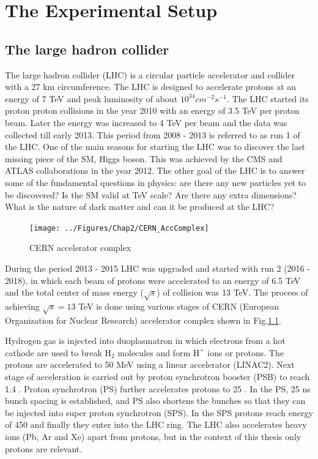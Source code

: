 \chapter{The Experimental Setup}
\label{Chap2}

\section{The large hadron collider}
The large hadron collider (LHC) is a circular particle accelerator and collider with a 27 km circumference. The LHC is designed to 
accelerate protons at an energy of 7 TeV \cite{Bruning:782076} and peak luminosity of about $10^{34}cm^{-2}s^{-1}$.
The LHC started its proton proton collisions in the year 2010 with an energy of 3.5 TeV per proton beam. Later the energy was increased
to 4 TeV per beam and the data was collected till early 2013. This period from 2008 - 2013 is referred to as run 1 of the LHC. 
One of the main reasons for starting the LHC was to discover the last missing piece of the SM, Higgs boson. This was
achieved by the CMS and ATLAS collaborations \cite{Aad:2012tfa}\cite{Chatrchyan:2012xdj} in the year 2012. The other goal of
the LHC is to answer some of the fundamental questions in physics: are there any new particles yet to be discovered?
Is the SM valid at TeV scale? Are there any extra dimensions? What is the nature of dark matter and can it be produced at the LHC?
\begin{figure}[h!]
\centering
\texttt{[image: ../Figures/Chap2/CERN\_AccComplex]}
\caption[CERN accelerator complex]{CERN accelerator complex}
\label{fig:CERN_AccComplex}
\end{figure}
During the period 2013 - 2015 LHC was upgraded and started with run 2 (2016 - 2018), in which each beam of protons were accelerated to 
an energy of 6.5 TeV and the total center of mass energy ($\sqrt{s}$) of collision was 13 TeV. The process of achieving $\sqrt{s} = 13$ 
TeV is done using various stages of CERN (European Organization for Nuclear Research) accelerator complex \cite{Haffner:1621894} shown in 
Fig.\ref{fig:CERN_AccComplex}.

Hydrogen gas is injected into duoplasmatron in which electrons from a hot cathode are used to break $\mathrm{H_2}$ molecules and form 
$\mathrm{H^+}$ ions or protons. The protons are accelerated to 50 MeV using a 
linear accelerator (LINAC2). Next stage of acceleration is carried out by proton synchrotron booster (PSB) to reach 1.4 \gev. Proton 
synchrotron (PS) further accelerates protons to 25 \gev. In the PS, 25 ns bunch spacing is established, and PS also shortens the bunches
so that they can be injected into super proton synchrotron (SPS). In the SPS protons reach energy 
of 450 \gev and finally they enter into the LHC ring. The LHC also accelerates heavy ions (Pb, Ar and Xe) apart from protons, but in the 
context of this thesis only protons are relevant.

